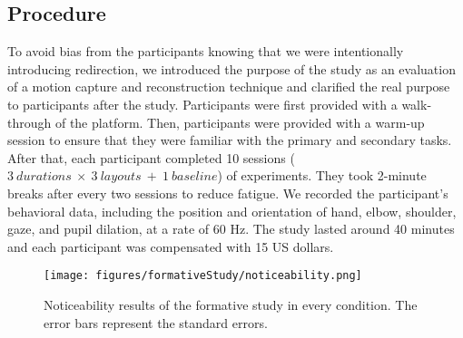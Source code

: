 
\subsection{Procedure}


To avoid bias from the participants knowing that we were intentionally introducing redirection, we introduced the purpose of the study as an evaluation of a motion capture and reconstruction technique and clarified the real purpose to participants after the study.
Participants were first provided with a walk-through of the platform.
Then, participants were provided with a warm-up session to ensure that they were familiar with the primary and secondary tasks.
After that, each participant completed 10 sessions ($3~durations~\times~3~layouts~+~1~baseline$) of experiments.
They took 2-minute breaks after every two sessions to reduce fatigue.
We recorded the participant's behavioral data, including the position and orientation of hand, elbow, shoulder, gaze, and pupil dilation, at a rate of 60 Hz.
The study lasted around 40 minutes and each participant was compensated with 15 US dollars.



\begin{figure}[t]
    \centering
    \texttt{[image: figures/formativeStudy/noticeability.png]}
    \caption{Noticeability results of the formative study in every condition.
    The error bars represent the standard errors.}
\end{figure}

